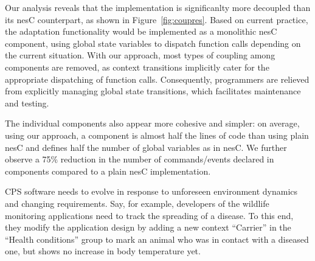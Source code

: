  Our analysis reveals that the
\conesc implementation is significanlty more decoupled than its nesC
counterpart, as shown in Figure~\ref{fig:coupres}. Based on current
practice, the adaptation functionality would be implemented as a
monolithic nesC component, using global state variables to dispatch
function calls depending on the current situation. With our approach,
most types of coupling among components are removed, as context
transitions implicitly cater for the appropriate dispatching of
function calls. Consequently, programmers are relieved from explicitly
managing global state transitions, which facilitates maintenance and
testing.

The individual \conesc components also appear more
cohesive and simpler: on average, using our approach, a component is
almost half the lines of code than using plain nesC and defines half
the number of global variables as in nesC. We further observe a 75\%
reduction in the number of commands/events declared in \conesc
components compared to a plain nesC implementation.



 CPS software needs to evolve in
response to unforeseen environment dynamics and changing
requirements. Say, for example, developers of the wildlife monitoring
applications need to track the spreading of a disease. To this end,
they modify the application design by adding a new context ``Carrier''
in the ``Health conditions'' group to mark an animal who was in
contact with a diseased one, but shows no increase in body temperature
yet.

